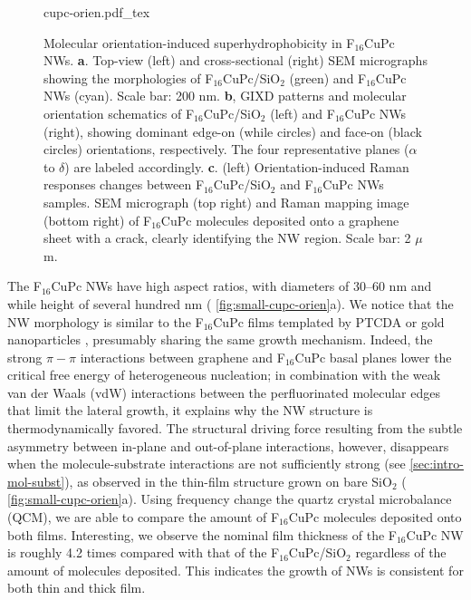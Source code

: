 \begin{figure}[htbp]
\centering
{cupc-orien.pdf_tex}
\caption{\label{fig:small-cupc-orien} Molecular orientation-induced
  superhydrophobicity in F$_{16}$CuPc NWs.  \textbf{a}. Top-view
  (left) and cross-sectional (right) SEM micrographs showing the
  morphologies of F\(_{\text{16}}\)CuPc/SiO\(_{\text{2}}\) (green) and
  F\(_{\text{16}}\)CuPc NWs (cyan). Scale bar: 200 nm. \textbf{b},
  GIXD patterns and molecular orientation schematics of
  F\(_{\text{16}}\)CuPc/SiO\(_{\text{2}}\) (left) and
  F\(_{\text{16}}\)CuPc NWs (right), showing dominant edge-on (while
  circles) and face-on (black circles) orientations, respectively. The
  four representative planes (\(\alpha\) to \(\delta\)) are labeled
  accordingly. \textbf{c}. (left) Orientation-induced Raman responses
  changes between F$_{16}$CuPc/SiO$_{2}$ and F$_{16}$CuPc NWs samples.
  SEM micrograph (top right) and Raman mapping image (bottom right) of
  F\(_{\text{16}}\)CuPc molecules deposited onto a graphene sheet with
  a crack, clearly identifying the NW region. Scale bar: 2 \(\mu\)m. }
\end{figure}

The F\(_{\text{16}}\)CuPc NWs have high aspect ratios, with diameters
of 30--60 nm and while height of several hundred nm (
\autoref{fig:small-cupc-orien}a).
%
We notice that the NW morphology is similar to the
F\(_{\text{16}}\)CuPc films templated by PTCDA
\cite{Yang_2009_F16_PTCDA} or gold nanoparticles
\cite{Mbenkum_2006_F16_1D}, presumably sharing the same growth
mechanism.
%
Indeed, the strong \(\pi-\pi\) interactions between
graphene and F\(_{\text{16}}\)CuPc basal planes lower the critical
free energy of heterogeneous nucleation; in combination with the weak
van der Waals (vdW) interactions between the perfluorinated molecular
edges that limit the lateral growth, it explains why the NW structure
is thermo\-dynamically favored.
%
The structural driving force resulting from the subtle asymmetry
between in-plane and out-of-plane interactions, however, disappears
when the molecule-substrate interactions are not sufficiently strong
(see \autoref{sec:intro-mol-subst}), as observed in the thin-film
structure grown on bare SiO\(_{\text{2}}\) (
\autoref{fig:small-cupc-orien}a).
%
Using frequency change  the quartz crystal
micro\-balance (QCM), we are able to compare the amount of
F$_{\mathrm{16}}$CuPc molecules deposited onto both
films. Interesting, we observe the nominal film thickness of the
F\(_{\text{16}}\)CuPc NW is roughly 4.2 times compared with that of
the F\(_{\text{16}}\)CuPc/SiO\(_{\text{2}}\) regardless of the amount
of molecules deposited. This indicates the growth of NWs is consistent
for both thin and thick film.

